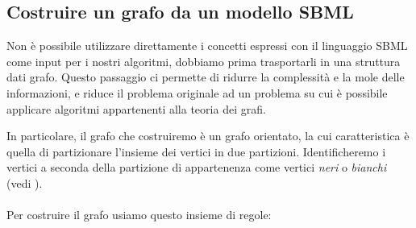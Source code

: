 \subsection{Costruire un grafo da un modello SBML}

Non \`e possibile utilizzare direttamente i concetti espressi con il
linguaggio SBML come input per i nostri algoritmi, dobbiamo prima
trasportarli in una struttura dati grafo. Questo passaggio ci permette
di ridurre la complessit\`a e la mole delle informazioni, e riduce il
problema originale ad un problema su cui \`e possibile applicare
algoritmi appartenenti alla teoria dei grafi.

In particolare, il grafo che costruiremo \`e un grafo orientato, la
cui caratteristica \`e quella di partizionare l'insieme dei vertici in
due partizioni. Identificheremo i vertici a seconda della partizione
di appartenenza come vertici \emph{neri} o \emph{bianchi} (vedi
\cite{tellingStories}).
\\\\
Per costruire il grafo usiamo questo insieme di regole:
